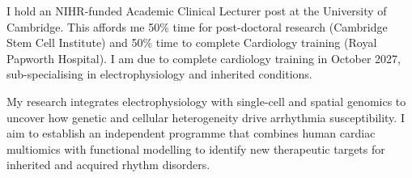 
\begin{small} \color{black}

I hold an NIHR-funded Academic Clinical Lecturer post at the University of Cambridge. This affords me 50\% time for post-doctoral research (Cambridge Stem Cell Institute) and 50\% time to complete Cardiology training (Royal Papworth Hospital). I am due to complete cardiology training in October 2027, sub-specialising in electrophysiology and inherited conditions.

My research integrates electrophysiology with single-cell and spatial genomics to uncover how genetic and cellular heterogeneity drive arrhythmia susceptibility. I aim to establish an independent programme that combines human cardiac multiomics with functional modelling to identify new therapeutic targets for inherited and acquired rhythm disorders.

\end{small}